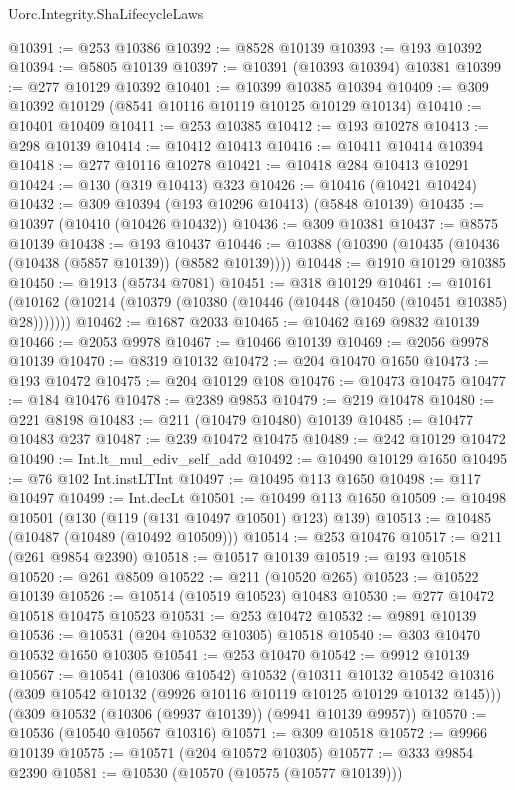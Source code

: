 \begin{lexlean}{Uorc.Integrity.ShaLifecycleLaws}
\begin{coremodule}
@10391 := @253 @10386
@10392 := @8528 @10139
@10393 := @193 @10392
@10394 := @5805 @10139
@10397 := @10391 (@10393 @10394) @10381
@10399 := @277 @10129 @10392
@10401 := @10399 @10385 @10394
@10409 := @309 @10392 @10129 (@8541 @10116 @10119 @10125 @10129 @10134)
@10410 := @10401 @10409
@10411 := @253 @10385
@10412 := @193 @10278
@10413 := @298 @10139
@10414 := @10412 @10413
@10416 := @10411 @10414 @10394
@10418 := @277 @10116 @10278
@10421 := @10418 @284 @10413 @10291
@10424 := @130 (@319 @10413) @323
@10426 := @10416 (@10421 @10424)
@10432 := @309 @10394 (@193 @10296 @10413) (@5848 @10139)
@10435 := @10397 (@10410 (@10426 @10432))
@10436 := @309 @10381
@10437 := @8575 @10139
@10438 := @193 @10437
@10446 := @10388 (@10390 (@10435 (@10436 (@10438 (@5857 @10139)) (@8582 @10139))))
@10448 := @1910 @10129 @10385
@10450 := @1913 (@5734 @7081)
@10451 := @318 @10129
@10461 := @10161 (@10162 (@10214 (@10379 (@10380 (@10446 (@10448 (@10450 (@10451 @10385) @28)))))))
@10462 := @1687 @2033
@10465 := @10462 @169 @9832 @10139
@10466 := @2053 @9978
@10467 := @10466 @10139
@10469 := @2056 @9978 @10139
@10470 := @8319 @10132
@10472 := @204 @10470 @1650
@10473 := @193 @10472
@10475 := @204 @10129 @108
@10476 := @10473 @10475
@10477 := @184 @10476
@10478 := @2389 @9853
@10479 := @219 @10478
@10480 := @221 @8198
@10483 := @211 (@10479 @10480) @10139
@10485 := @10477 @10483 @237
@10487 := @239 @10472 @10475
@10489 := @242 @10129 @10472
@10490 := Int.lt_mul_ediv_self_add
@10492 := @10490 @10129 @1650
@10495 := @76 @102 Int.instLTInt
@10497 := @10495 @113 @1650
@10498 := @117 @10497
@10499 := Int.decLt
@10501 := @10499 @113 @1650
@10509 := @10498 @10501 (@130 (@119 (@131 @10497 @10501) @123) @139)
@10513 := @10485 (@10487 (@10489 (@10492 @10509)))
@10514 := @253 @10476
@10517 := @211 (@261 @9854 @2390)
@10518 := @10517 @10139
@10519 := @193 @10518
@10520 := @261 @8509
@10522 := @211 (@10520 @265)
@10523 := @10522 @10139
@10526 := @10514 (@10519 @10523) @10483
@10530 := @277 @10472 @10518 @10475 @10523
@10531 := @253 @10472
@10532 := @9891 @10139
@10536 := @10531 (@204 @10532 @10305) @10518
@10540 := @303 @10470 @10532 @1650 @10305
@10541 := @253 @10470
@10542 := @9912 @10139
@10567 := @10541
    (@10306 @10542)
    @10532
    (@10311
      @10132
      @10542
      @10316
      (@309 @10542 @10132 (@9926 @10116 @10119 @10125 @10129 @10132 @145)))
    (@309 @10532 (@10306 (@9937 @10139)) (@9941 @10139 @9957))
@10570 := @10536 (@10540 @10567 @10316)
@10571 := @309 @10518
@10572 := @9966 @10139
@10575 := @10571 (@204 @10572 @10305)
@10577 := @333 @9854 @2390
@10581 := @10530 (@10570 (@10575 (@10577 @10139)))

\end{coremodule}
\end{lexlean}
